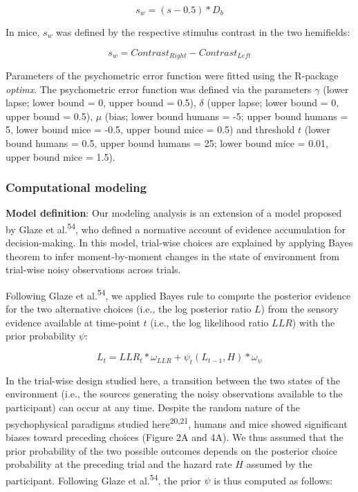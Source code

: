 \documentclass[
]{article}
\begin{document}
\begin{equation}
s_w = (s - 0.5) * D_b
\end{equation}

In mice, \(s_w\) was defined by the respective stimulus contrast in the
two hemifields:

\begin{equation}
s_w = Contrast_{Right} - Contrast_{Left}
\end{equation}

Parameters of the psychometric error function were fitted using the
R-package \emph{optimx}. The psychometric error function was defined via
the parameters \(\gamma\) (lower lapse; lower bound = 0, upper bound =
0.5), \(\delta\) (upper lapse; lower bound = 0, upper bound = 0.5),
\(\mu\) (bias; lower bound humans = -5; upper bound humans = 5, lower
bound mice = -0.5, upper bound mice = 0.5) and threshold \(t\) (lower
bound humans = 0.5, upper bound humans = 25; lower bound mice = 0.01,
upper bound mice = 1.5).

\hypertarget{computational-modeling}{%
\subsubsection{Computational modeling}\label{computational-modeling}}

\textbf{Model definition}: Our modeling analysis is an extension of a
model proposed by Glaze et al.\textsuperscript{54}, who defined a
normative account of evidence accumulation for decision-making. In this
model, trial-wise choices are explained by applying Bayes theorem to
infer moment-by-moment changes in the state of environment from
trial-wise noisy observations across trials.

Following Glaze et al.\textsuperscript{54}, we applied Bayes rule to
compute the posterior evidence for the two alternative choices (i.e.,
the log posterior ratio \(L\)) from the sensory evidence available at
time-point \(t\) (i.e., the log likelihood ratio \(LLR\)) with the prior
probability \(\psi\):

\begin{equation}
L_t = LLR_t * \omega_{LLR} + \psi_t(L_{t-1}, H) * \omega_{\psi}
\end{equation}

In the trial-wise design studied here, a transition between the two
states of the environment (i.e., the sources generating the noisy
observations available to the participant) can occur at any time.
Despite the random nature of the psychophysical paradigms studied
here\textsuperscript{20,21}, humans and mice showed significant biases
toward preceding choices (Figure 2A and 4A). We thus assumed that the
prior probability of the two possible outcomes depends on the posterior
choice probability at the preceding trial and the hazard rate \(H\)
assumed by the participant. Following Glaze et al.\textsuperscript{54},
the prior \(\psi\) is thus computed as follows:
\end{document}
